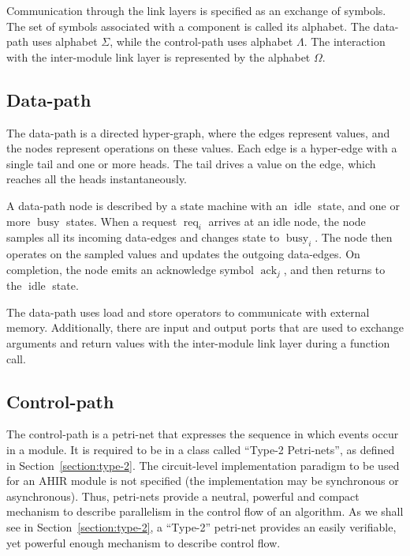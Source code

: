 \documentclass[conference]{IEEEtran}
\newcommand{\sym}[1]{$\operatorname{#1}$}
\begin{document}
Communication through the link layers is specified as an exchange of
symbols. The set of symbols associated with a component is called its
alphabet. The data-path uses alphabet $\Sigma$, while the control-path
uses alphabet $\Lambda$. The interaction with the inter-module link
layer is represented by the alphabet $\Omega$.

\subsection{Data-path}

The data-path is a directed hyper-graph, where the edges represent
values, and the nodes represent operations on these values. Each edge
is a hyper-edge with a single tail and one or more heads. The tail
drives a value on the edge, which reaches all the heads
instantaneously.

A data-path node is described by a state machine with an \sym{idle}
state, and one or more \sym{busy} states. When a request
$\operatorname{req}_i$ arrives at an idle node, the node samples all
its incoming data-edges and changes state to $\operatorname{busy}_i$.
The node then operates on the sampled values and updates the outgoing
data-edges. On completion, the node emits an acknowledge symbol
$\operatorname{ack}_j$, and then returns to the \sym{idle} state.

The data-path uses load and store operators to communicate with
external memory. Additionally, there are input and output ports that
are used to exchange arguments and return values with the inter-module
link layer during a function call.

\subsection{Control-path}


The control-path is a petri-net that expresses the sequence in which
events occur in a module. It is required to be in a class called
``Type-2 Petri-nets'', as defined in Section~\ref{section:type-2}.
The circuit-level implementation paradigm to be used for an AHIR module is
not specified (the implementation may be synchronous or asynchronous).
Thus, petri-nets provide a neutral, powerful and compact mechanism to 
describe parallelism in the control flow of an algorithm.  
As we shall see in Section~\ref{section:type-2}, a ``Type-2'' petri-net
provides an easily verifiable, yet powerful enough mechanism to
describe control flow.
\end{document}
